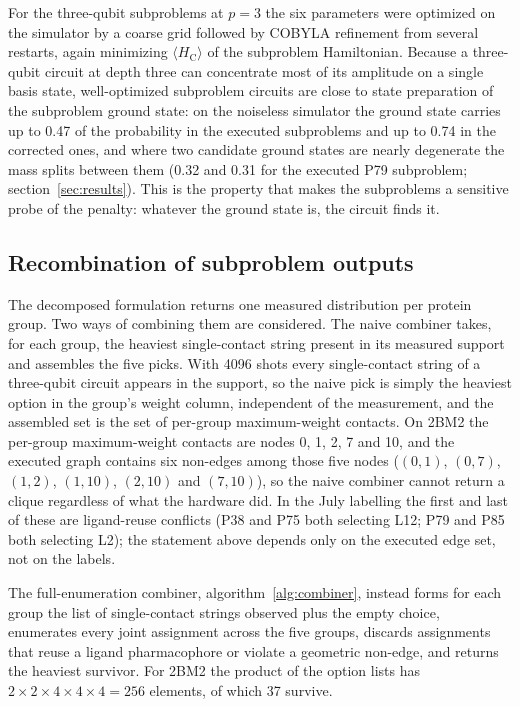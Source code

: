 \documentclass{iopjournal}
\newcommand{\Hc}{H_{\mathrm{C}}}
\begin{document}
For the three-qubit subproblems at $p=3$ the six parameters were optimized on the simulator by a coarse grid followed by COBYLA refinement from several restarts, again minimizing $\langle \Hc \rangle$ of the subproblem Hamiltonian. Because a three-qubit circuit at depth three can concentrate most of its amplitude on a single basis state, well-optimized subproblem circuits are close to state preparation of the subproblem ground state: on the noiseless simulator the ground state carries up to 0.47 of the probability in the executed subproblems and up to 0.74 in the corrected ones, and where two candidate ground states are nearly degenerate the mass splits between them (0.32 and 0.31 for the executed P79 subproblem; section~\ref{sec:results}). This is the property that makes the subproblems a sensitive probe of the penalty: whatever the ground state is, the circuit finds it.

\subsection{Recombination of subproblem outputs}
\label{sec:combiner}
The decomposed formulation returns one measured distribution per protein group. Two ways of combining them are considered. The naive combiner takes, for each group, the heaviest single-contact string present in its measured support and assembles the five picks. With 4096 shots every single-contact string of a three-qubit circuit appears in the support, so the naive pick is simply the heaviest option in the group's weight column, independent of the measurement, and the assembled set is the set of per-group maximum-weight contacts. On 2BM2 the per-group maximum-weight contacts are nodes 0, 1, 2, 7 and 10, and the executed graph contains six non-edges among those five nodes ($(0,1)$, $(0,7)$, $(1,2)$, $(1,10)$, $(2,10)$ and $(7,10)$), so the naive combiner cannot return a clique regardless of what the hardware did. In the July labelling the first and last of these are ligand-reuse conflicts (P38 and P75 both selecting L12; P79 and P85 both selecting L2); the statement above depends only on the executed edge set, not on the labels.

The full-enumeration combiner, algorithm~\ref{alg:combiner}, instead forms for each group the list of single-contact strings observed plus the empty choice, enumerates every joint assignment across the five groups, discards assignments that reuse a ligand pharmacophore or violate a geometric non-edge, and returns the heaviest survivor. For 2BM2 the product of the option lists has $2\times2\times4\times4\times4 = 256$ elements, of which 37 survive.
\end{document}
